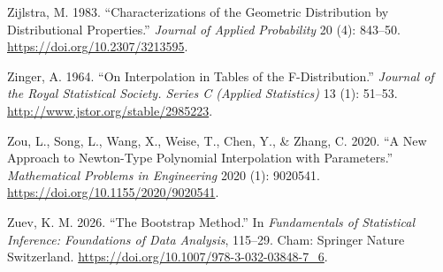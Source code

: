 \documentclass[
]{article}
\newlength{\cslhangindent}
\newlength{\cslentryspacingunit} %
\newenvironment{CSLReferences}[2] %
 {%
  \setlength{\parindent}{0pt}
  \ifodd #1
  \let\oldpar\par
  \def\par{\hangindent=\cslhangindent\oldpar}
  \fi
  \setlength{\parskip}{#2\cslentryspacingunit}
 }%
 {}
\begin{document}
\begin{CSLReferences}{1}{0}
\leavevmode{}%
Zijlstra, M. 1983. {``Characterizations of the Geometric Distribution by
Distributional Properties.''} \emph{Journal of Applied Probability} 20
(4): 843--50. \url{https://doi.org/10.2307/3213595}.

\leavevmode{}%
Zinger, A. 1964. {``{On Interpolation in Tables of the
F-Distribution}.''} \emph{Journal of the Royal Statistical Society.
Series C (Applied Statistics)} 13 (1): 51--53.
\url{http://www.jstor.org/stable/2985223}.

\leavevmode{}%
Zou, L., Song, L., Wang, X., Weise, T., Chen, Y., \& Zhang, C. 2020.
{``A New Approach to Newton-Type Polynomial Interpolation with
Parameters.''} \emph{Mathematical Problems in Engineering} 2020 (1):
9020541. \url{https://doi.org/10.1155/2020/9020541}.

\leavevmode{}%
Zuev, K. M. 2026. {``The Bootstrap Method.''} In \emph{Fundamentals of
Statistical Inference: Foundations of Data Analysis}, 115--29. Cham:
Springer Nature Switzerland.
\url{https://doi.org/10.1007/978-3-032-03848-7_6}.

\end{CSLReferences}
\end{document}
